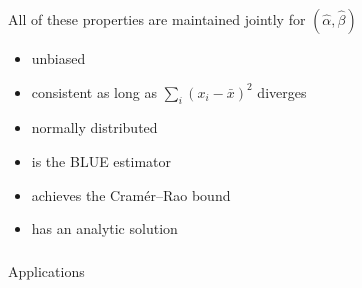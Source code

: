 \begin{frame}[fragile] \frametitle{}

All of these properties are maintained jointly for $(\widehat{\alpha}, \widehat{\beta})$
\begin{itemize}
\item unbiased
\item consistent as long as $\sum_i (x_i-\bar{x})^2$ diverges
\item normally distributed
\item is the BLUE estimator
\item achieves the Cramér–Rao bound
\item has an analytic solution
\end{itemize}

\end{frame}

\begin{frame}[fragile] \frametitle{}

\begin{flushright}
{\color{yaleblue}\sc\fontsize{1cm}{0cm}\selectfont Applications}
\end{flushright}

\end{frame}

